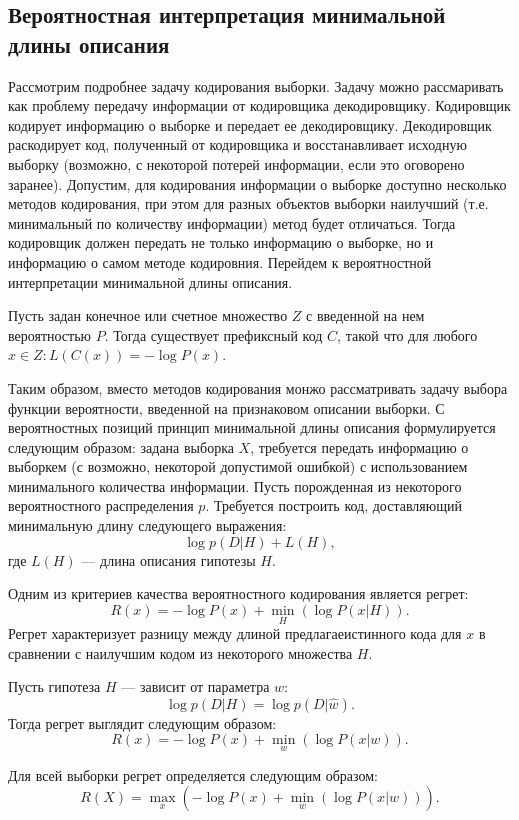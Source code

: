 \documentclass[../main.tex]{subfiles}
\begin{document}
\subsection{Вероятностная интерпретация минимальной длины описания}
Рассмотрим подробнее задачу кодирования выборки. Задачу можно рассмаривать как проблему передачу информации от кодировщика декодировщику. Кодировщик кодирует информацию о выборке и передает ее декодировщику. Декодировщик раскодирует код, полученный от кодировщика и восстанавливает исходную выборку (возможно, с некоторой потерей информации, если это оговорено заранее).
Допустим, для кодирования информации о выборке доступно несколько методов кодирования, при этом для разных объектов выборки наилучший (т.е. минимальный по количеству информации) метод будет отличаться. Тогда кодировщик должен передать не только информацию о выборке, но и информацию о самом методе кодировния. Перейдем к вероятностной интерпретации минимальной длины описания.

\begin{theorembd}
Пусть задан конечное или счетное множество $Z$ с введенной на нем вероятностью $P$. Тогда существует префиксный код $C$, такой что для любого $x \in Z : L(C(x)) = -\log P(x)$.
\end{theorembd}

Таким образом, вместо методов кодирования монжо рассматривать задачу выбора функции вероятности, введенной на признаковом описании выборки. 
С вероятностных позиций принцип минимальной длины описания формулируется следующим образом: задана выборка $X$, требуется передать информацию о выборкем (с возможно, некоторой допустимой ошибкой) с использованием минимального количества информации. Пусть
 порожденная из некоторого вероятностного распределения $p$. Требуется построить код, доставляющий минимальную длину следующего выражения:
\[
    \log p(D|H) + L(H), 
\]
где $L(H)$ --- длина описания гипотезы $H$. 


Одним из критериев качества вероятностного кодирования является регрет:
\[
R(x) =  - \log P(x) + \min_{H} (\log P(x|H)).
\]
Регрет характеризует разницу между длиной предлагаеистинного кода для $x$ в сравнении с наилучшим кодом из некоторого множества $H$.

Пусть гипотеза $H$ --- зависит от параметра $w$:
\[
    \log p(D|H) = \log p(D|\hat{w}).    
\]
Тогда регрет выглядит следующим образом:
\[
R(x) =  - \log P(x) + \min_{w} (\log P(x|w)).
\]

Для всей выборки регрет определяется следующим образом:
\[
R(X) =  \max_{x} (- \log P(x) + \min_{w} (\log P(x|w))).
\]
\end{document}
